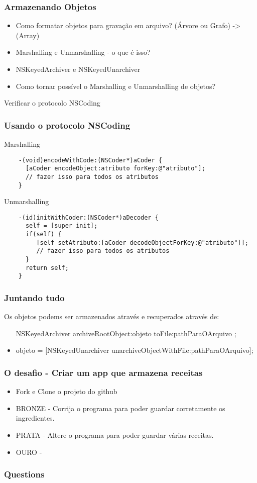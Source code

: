 \documentclass[serif,mathserif]{beamer}
\begin{document}
\begin{frame}
  \frametitle{Armazenando Objetos}
  \begin{itemize}
  \item Como formatar objetos para gravação em arquivo? (Árvore ou Grafo) -> (Array) 
  \item Marshalling e Unmarshalling - o que é isso?
  \item NSKeyedArchiver e NSKeyedUnarchiver
  \item Como tornar possível o Marshalling e Unmarshalling de objetos? 
  \end{itemize}
  Verificar o protocolo NSCoding
\end{frame}  


\begin{frame}[fragile]
  \frametitle{Usando o protocolo NSCoding}
  Marshalling
  \begin{lstlisting}
    -(void)encodeWithCode:(NSCoder*)aCoder {
      [aCoder encodeObject:atributo forKey:@"atributo"];
      // fazer isso para todos os atributos
    }
  \end{lstlisting}
  Unmarshalling
  \begin{lstlisting}    
    -(id)initWithCoder:(NSCoder*)aDecoder {
      self = [super init];
      if(self) {
         [self setAtributo:[aCoder decodeObjectForKey:@"atributo"]];
         // fazer isso para todos os atributos
      }
      return self;
    }
  \end{lstlisting}  
\end{frame}



\begin{frame}
    \frametitle{Juntando tudo}
    Os objetos podems ser armazenados através e recuperados através de:
    \begin{itemize}
    \item [NSKeyedArchiver archiveRootObject:objeto toFile:pathParaOArquivo];
    \item objeto = [NSKeyedUnarchiver unarchiveObjectWithFile:pathParaOArquivo];
    \end{itemize}
\end{frame}


\begin{frame}
  \frametitle{O desafio - Criar um app que armazena receitas}
  \begin{itemize}
  \item Fork e Clone o projeto do github
  \item BRONZE - Corrija o programa para poder guardar corretamente os ingredientes.
  \item PRATA - Altere o programa para poder guardar várias receitas.
  \item OURO - 
  \end{itemize}
\end{frame}



\begin{frame}
  \frametitle{Questions}
\end{frame}
\end{document}
